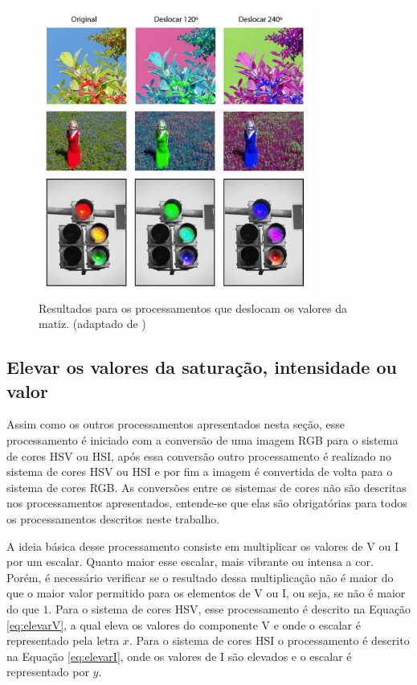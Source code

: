 \documentclass[	12pt, Times, openright, twoside, a4paper, english, brazil]{abntex2}
\begin{document}
\begin{figure}[!htb]
\centering \includegraphics[width=0.80\textwidth]{figuraRealDeslocamento.jpg}
\caption{Resultados para os processamentos que deslocam os valores da matiz. (adaptado de )}
 \label{fig:figuraRealDeslocamento}
\end{figure}

\subsection{Elevar os valores da saturação, intensidade ou valor}
\label{subsec:deslocarVouI}

Assim como os outros processamentos apresentados nesta seção, esse processamento é iniciado com a conversão de uma imagem RGB para o sistema de cores HSV ou HSI, após essa conversão outro processamento é realizado no sistema de cores HSV ou HSI e por fim a imagem é convertida de volta para o sistema de cores RGB. As conversões entre os sistemas de cores não são descritas nos processamentos apresentados, entende-se que elas são obrigatórias para todos os processamentos descritos neste trabalho.

A ideia básica desse processamento consiste em multiplicar os valores de V ou I por um escalar. Quanto maior esse escalar, mais vibrante ou intensa a cor. Porém, é necessário verificar se o resultado dessa multiplicação não é maior do que o maior valor permitido para os elementos de V ou I, ou seja, se não é maior do que $1$. Para o sistema de cores HSV, esse processamento é descrito na Equação \ref{eq:elevarV}, a qual eleva os valores do componente V e onde o escalar é representado pela letra $x$. Para o sistema de cores HSI o processamento é descrito na Equação \ref{eq:elevarI}, onde os valores de I são elevados e o escalar é representado por $y$.
\end{document}

